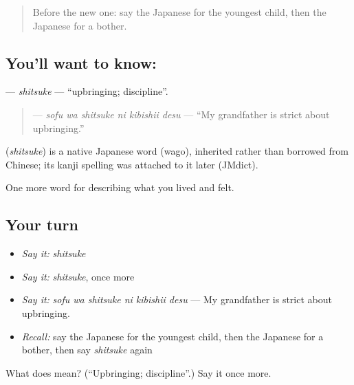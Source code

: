 \begin{quote}
Before the new one: say the Japanese for the youngest child, then the Japanese for a bother.
\end{quote}

\subsection*{You'll want to know: }
\textbf{} — \emph{shitsuke} — \textquotedblleft{}upbringing; discipline\textquotedblright{}.

\begin{quote}
\textbf{  } — \emph{sofu wa shitsuke ni kibishii desu} — \textquotedblleft{}My grandfather is strict about upbringing.\textquotedblright{}
\end{quote}

\begin{cousinweb}
\textbf{} (\emph{shitsuke}) is a native Japanese word (wago), inherited rather than borrowed from Chinese; its kanji spelling was attached to it later (JMdict).
\end{cousinweb}

\begin{grammarlens}[title={What you've built}]
One more word for describing what you lived and felt.
\end{grammarlens}

\subsection*{Your turn}
\begin{itemize}
\raggedright
  \item \emph{Say it:} \emph{shitsuke}
  \item \emph{Say it:} \emph{shitsuke}, once more
  \item \emph{Say it:} \emph{sofu wa shitsuke ni kibishii desu} — My grandfather is strict about upbringing.
  \item \emph{Recall:} say the Japanese for the youngest child, then the Japanese for a bother, then say \emph{shitsuke} again
\end{itemize}

\begin{tcolorbox}[breakable,colback=teal!4,colframe=teal!35!black,title={Before you move on}]
What does  mean? (\textquotedblleft{}Upbringing; discipline\textquotedblright{}.) Say it once more.
\end{tcolorbox}
